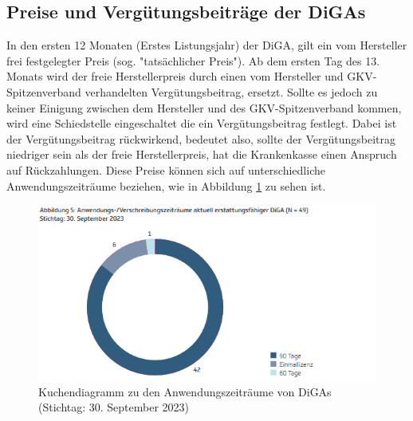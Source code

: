 \documentclass{article}
\begin{document}
		\subsection{Preise und Vergütungsbeiträge der DiGAs}  
			In den ersten 12 Monaten (Erstes Listungsjahr) der DiGA, gilt ein vom Hersteller frei festgelegter Preis (sog. "tatsächlicher Preis"). Ab dem ersten Tag des 13. Monats wird der freie Herstellerpreis durch einen vom Hersteller und GKV-Spitzenverband verhandelten Vergütungsbeitrag, ersetzt. Sollte es jedoch zu keiner Einigung zwischen dem Hersteller und des GKV-Spitzenverband kommen, wird eine Schiedstelle eingeschaltet die ein Vergütungsbeitrag festlegt. Dabei ist der Vergütungsbeitrag rückwirkend, bedeutet also, sollte der Vergütungsbeitrag niedriger sein als der freie Herstellerpreis, hat die Krankenkasse einen Anspruch auf Rückzahlungen\cite[vgl. S. 11]{TK-Report-2}. Diese Preise können sich auf unterschiedliche Anwendungszeiträume beziehen, wie in Abbildung \ref{Abb-andwendungszeiträume-diga} zu sehen ist. 
			\begin{figure}[hbtp]
				\includegraphics[width=\textwidth]{./grafiken/anwendungszeitraume_diga}
				\caption[Anwendungszeiträume von DiGAs]{Kuchendiagramm zu den Anwendungszeiträume von DiGAs (Stichtag: 30. September 2023)}
				\label{Abb-andwendungszeiträume-diga}
			\end{figure}
\end{document}
